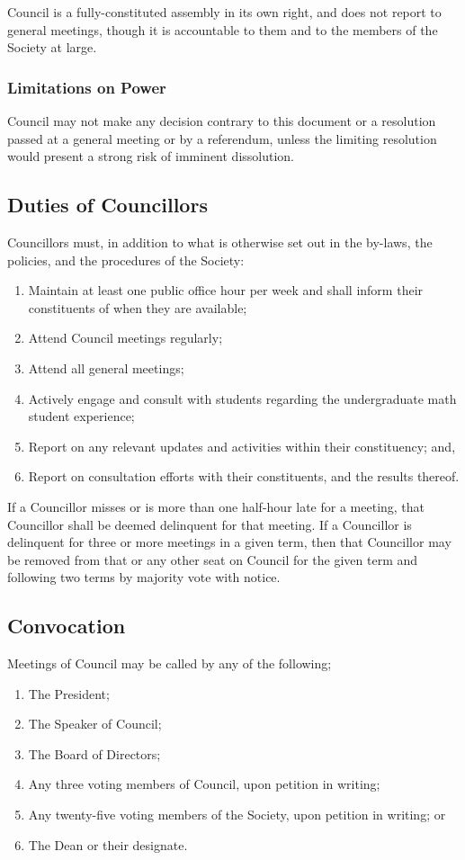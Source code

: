 Council is a fully-constituted assembly in its own right,
and does not report to general meetings, though it is accountable to them and
to the members of the Society at large.

\subsubsection{Limitations on Power}
Council may not make any decision contrary to this document or a
resolution passed at a general meeting or by a referendum, unless the limiting
resolution would present a strong risk of imminent dissolution.

\subsection{Duties of Councillors}

Councillors must, in addition to what is otherwise set out in the by-laws,
the policies, and the procedures of the Society:
\begin{enumerate}
    \item Maintain at least one public office hour per week and shall inform
        their constituents of when they are available; 
    \item Attend Council meetings regularly; 
    \item Attend all general meetings;
    \item Actively engage and consult with students regarding the undergraduate
        math student experience;
    \item Report on any relevant updates and activities within their
        constituency; and,
    \item Report on consultation efforts with their constituents, and the
        results thereof.
\end{enumerate}

If a Councillor misses or is more than one half-hour late for a meeting, that Councillor shall be deemed delinquent for that meeting. If a Councillor is delinquent for three or more meetings in a given term, then that Councillor may be removed from that or any other seat on Council for the given term and following two terms by majority vote with notice.

\subsection{Convocation}
Meetings of Council may be called by any of the following;
\begin{enumerate}
  \item The President;
  \item The Speaker of Council;
  \item The Board of Directors;
  \item Any three voting members of Council, upon petition in writing;
  \item Any twenty-five voting members of the Society, upon petition in writing;
    or
  \item The Dean or their designate.
\end{enumerate}

